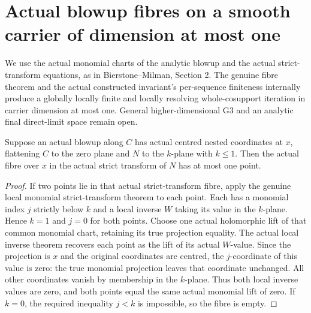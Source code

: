 \section{Actual blowup fibres on a smooth carrier of dimension at most one}

We use the actual monomial charts of the analytic blowup and the actual
strict-transform equations, as in Bierstone--Milman\cite{bierstone-milman08-functoriality},
Section 2. The genuine fibre theorem and the actual constructed invariant's
per-sequence finiteness internally produce a globally locally finite and
locally resolving whole-cosupport iteration in carrier dimension at most one.
General higher-dimensional G3 and an analytic final direct-limit space remain open.

\begin{lemma}
\label{hir:curve-strict-flat-fibre-subsingleton}
\leanok
Suppose an actual blowup along $C$ has actual centred nested coordinates at
$x$, flattening $C$ to the zero plane and $N$ to the $k$-plane with $k\le1$.
Then the actual fibre over $x$ in the actual strict transform of $N$ has at
most one point.
\end{lemma}
\begin{proof}
If two points lie in that actual strict-transform fibre, apply the genuine
local monomial strict-transform theorem to each point. Each has a monomial
index $j$ strictly below $k$ and a local inverse $W$ taking its value in the
$k$-plane. Hence $k=1$ and $j=0$ for both points. Choose one actual holomorphic
lift of that common monomial chart, retaining its true projection equality.
The actual local inverse theorem recovers each point as the lift of its
actual $W$-value. Since the projection is $x$ and the original coordinates
are centred, the $j$-coordinate of this value is zero: the true monomial
projection leaves that coordinate unchanged. All other coordinates vanish
by membership in the $k$-plane. Thus both local inverse values are zero,
and both points equal the same actual monomial lift of zero. If $k=0$,
the required inequality $j<k$ is impossible, so the fibre is empty.
\end{proof}

